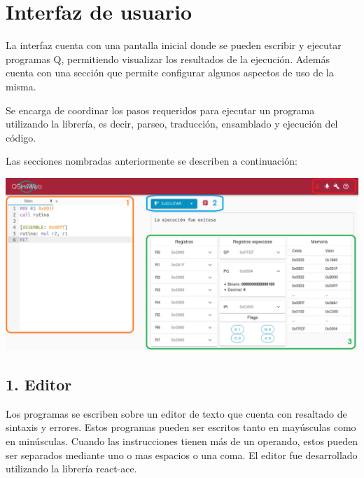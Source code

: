 \section{Interfaz de usuario}

La interfaz cuenta con una pantalla inicial donde se pueden escribir y ejecutar programas Q, permitiendo visualizar los resultados de la ejecución. 
Además cuenta con una sección que permite configurar algunos aspectos de uso de la misma.

Se encarga de coordinar los pasos requeridos para ejecutar un programa utilizando la librería, es decir, parseo, traducción, ensamblado y ejecución del código. 

Las secciones nombradas anteriormente se describen a continuación:

\begin{center}
  \includegraphics[width=14cm]{figuras/app-completa-dividida.png}
\end{center}

\subsection*{1. Editor}
Los programas se escriben sobre un editor de texto que cuenta con resaltado de sintaxis y errores. Estos programas pueden ser escritos tanto
en mayúsculas como en minúsculas. Cuando las instrucciones tienen más de un operando, estos pueden ser separados mediante uno o mas espacios o una coma.
El editor fue desarrollado utilizando la librería react-ace.

